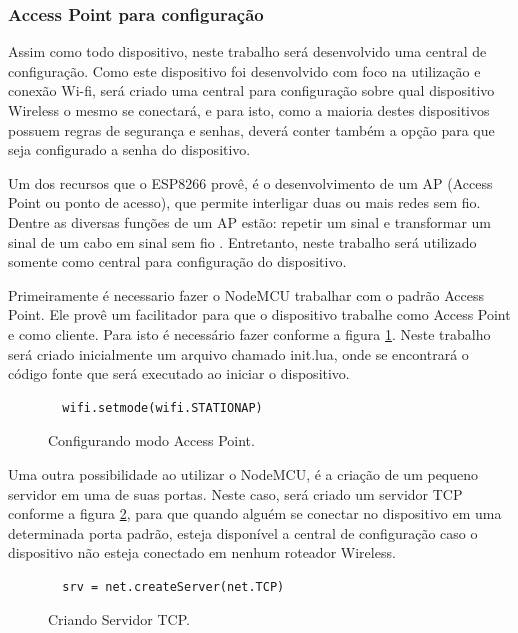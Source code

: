 \documentclass[journal]{IEEEtran}
\begin{document}
\subsubsection{Access Point para configuração}

Assim como todo dispositivo, neste trabalho será desenvolvido uma central de configuração. Como este dispositivo foi desenvolvido com foco na utilização e conexão Wi-fi, será criado uma central para configuração sobre qual dispositivo Wireless o mesmo se conectará, e para isto, como a maioria destes dispositivos possuem regras de segurança e senhas, deverá conter também a opção para que seja configurado a senha do dispositivo. 

Um dos recursos que o ESP8266 provê, é o desenvolvimento de um AP (Access Point ou ponto de acesso), que permite interligar duas ou mais redes sem fio. Dentre as diversas funções de um AP estão: repetir um sinal e transformar um sinal de um cabo em sinal sem fio \cite{accesspoint}. Entretanto, neste trabalho será utilizado somente como central para configuração do dispositivo.

Primeiramente é necessario fazer o NodeMCU trabalhar com o padrão Access Point. Ele provê um facilitador para que o dispositivo trabalhe como Access Point e como cliente. Para isto é necessário fazer conforme a figura \ref{alg:STATIONAP}. Neste trabalho será criado inicialmente um arquivo chamado init.lua, onde se encontrará o código fonte que será executado ao iniciar o dispositivo.

\begin{figure}[h]
\centering

\begin{lstlisting}
  wifi.setmode(wifi.STATIONAP)
\end{lstlisting}

\caption{Configurando modo Access Point.}
\label{alg:STATIONAP}
\end{figure}

Uma outra possibilidade ao utilizar o NodeMCU, é a criação de um pequeno servidor em uma de suas portas. Neste caso, será criado um servidor TCP conforme a figura \ref{alg:TCPSERVER}, para que quando alguém se conectar no dispositivo em uma determinada porta padrão, esteja disponível a central de configuração caso o dispositivo não esteja conectado em nenhum roteador Wireless.

\begin{figure}[h]
\centering

\begin{lstlisting}
  srv = net.createServer(net.TCP)
\end{lstlisting}

\caption{Criando Servidor TCP.}
\label{alg:TCPSERVER}
\end{figure}
\end{document}
